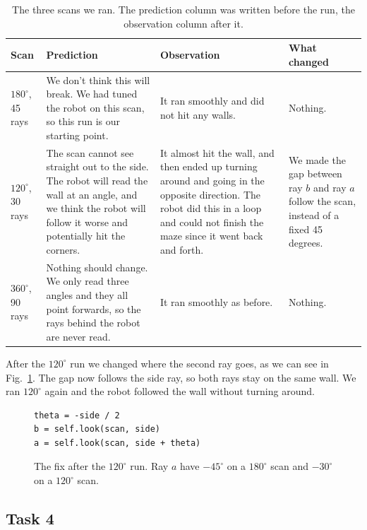 \documentclass[conference]{IEEEtran}
\begin{document}
\begin{table}[H]
\caption{The three scans we ran. The prediction column was written before the
         run, the observation column after it.}
\label{tab:t3_fov}
\centering
\scriptsize
\setlength{\tabcolsep}{4pt}
\begin{tabular}{@{}p{13mm} p{25mm} p{25mm} p{17mm}@{}}
\toprule
\textbf{Scan} & \textbf{Prediction} & \textbf{Observation} &
\textbf{What changed} \\
\midrule

$180^\circ$, 45 rays &
We don't think this will break. We had tuned the robot on this scan, so this
run is our starting point. &
It ran smoothly and did not hit any walls. &
Nothing. \\
\addlinespace

$120^\circ$, 30 rays &
The scan cannot see straight out to the side. The robot will read the wall at
an angle, and we think the robot will follow it worse and potentially hit the
corners. &
It almost hit the wall, and then ended up turning around and going in
the opposite direction. The robot did this in a loop and could not finish the
maze since it went back and forth. &
We made the gap between ray $b$ and ray $a$ follow the scan, instead of a fixed 45 degrees. \\
\addlinespace

$360^\circ$, 90 rays &
Nothing should change. We only read three angles and they all point forwards,
so the rays behind the robot are never read. &
It ran smoothly as before. &
Nothing. \\
\bottomrule
\end{tabular}
\end{table}

After the $120^\circ$ run we changed where the second ray goes, as we can see
in Fig.~\ref{lst:t3_gap}. The gap now follows the side ray, so both rays stay
on the same wall. We ran $120^\circ$ again and the robot followed the wall
without turning around.

\begin{figure}[H]
\begin{verbatim}
theta = -side / 2
b = self.look(scan, side)
a = self.look(scan, side + theta)
\end{verbatim}
\caption{The fix after the $120^\circ$ run. Ray $a$ have $-45^\circ$ on a
         $180^\circ$ scan and $-30^\circ$ on a $120^\circ$ scan.}
\label{lst:t3_gap}
\end{figure}

\subsection{Task 4}
\end{document}

